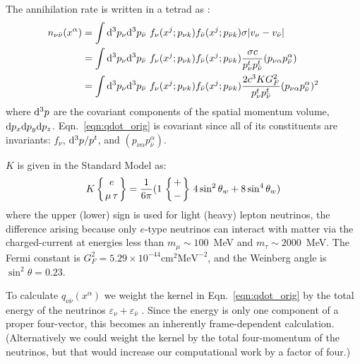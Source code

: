 The annihilation rate is written in a tetrad as \cite{good1987-nunubar}:
\begin{align}
  \label{eqn:qdot_orig}
  n_{\nu \bar{\nu}}(x^\alpha)
  &= \int \mathrm{d}^3p_{\nu} \mathrm{d}^3p_{\bar{\nu}} \,\,
  f_{\nu}(x^j;p_{\nu k})
  f_{\bar{\nu}}(x^j;p_{\bar{\nu} k})
  \sigma |v_\nu-v_{\bar{\nu}}| \nonumber \\
  &= \int \mathrm{d}^3p_\nu \mathrm{d}^3p_{\bar{\nu}} \,\,
  f_{\nu}(x^j;p_{\nu k})
  f_{\bar{\nu}}(x^j;p_{\bar{\nu} k})
  \frac{\sigma c}{p_{\nu}^t p_{\bar{\nu}}^t} (p_{\nu \alpha}  p_{\bar{\nu}}^\alpha) \nonumber \\
  &= \int \mathrm{d}^3p_{\nu} \mathrm{d}^3p_{\bar{\nu}} \,\,
  f_{\nu}(x^j;p_{\nu k})
  f_{\bar{\nu}}(x^j;p_{\bar{\nu} k})
  \frac{2 c^3 K G_F^2}{p_{\nu}^t p_{\bar{\nu}}^t}
  (p_{\nu \alpha} p_{\bar{\nu}}^\alpha)^2
\end{align}
where $\mathrm{d}^3p$ are the covariant components of the spatial momentum volume,
$\mathrm{d} p_x \mathrm{d} p_y \mathrm{d} p_z$.
Eqn.~\ref{eqn:qdot_orig} is covariant since all of its constituents are
invariants: $f_\nu$, $\mathrm{d}^3p/p^t$, and $(p_{\nu \alpha} p_{\bar{\nu}}^\alpha)$.

$K$ is given in the Standard Model as:
\begin{equation}
  K \left\{{e \atop \mu \, \tau}\right\} = \frac{1}{6\pi}
  (1 \, \left\{{+ \atop -}\right\}
  \, 4 \sin^2 \theta_w + 8 \sin^4 \theta_w) \nonumber
\end{equation}
where the upper (lower) sign is used for light (heavy) lepton neutrinos,
the difference arising because only $e$-type neutrinos can interact with
matter via the charged-current at energies less than $m_\mu\sim100$~MeV
and $m_\tau\sim2000$~MeV.
The Fermi constant is $G_F^2 = 5.29 \times 10^{-44} \text{cm}^2 \text{MeV}^{-2}$,
and the Weinberg angle is $\sin^2 \theta = 0.23$.

To calculate $q_{\nu \bar{\nu}}(x^\alpha)$ we weight the kernel in
Eqn.~\ref{eqn:qdot_orig} by the total energy of the neutrinos
$\varepsilon_{\nu} + \varepsilon_{\bar{\nu}}$
\citep{asan2000-nunubar, salm1999-nunubar}.
Since the energy is only one component of a proper four-vector, this becomes an
inherently frame-dependent calculation.
(Alternatively we could weight the kernel by the total four-momentum of the
neutrinos, but that would increase our computational work by a factor of four.)

